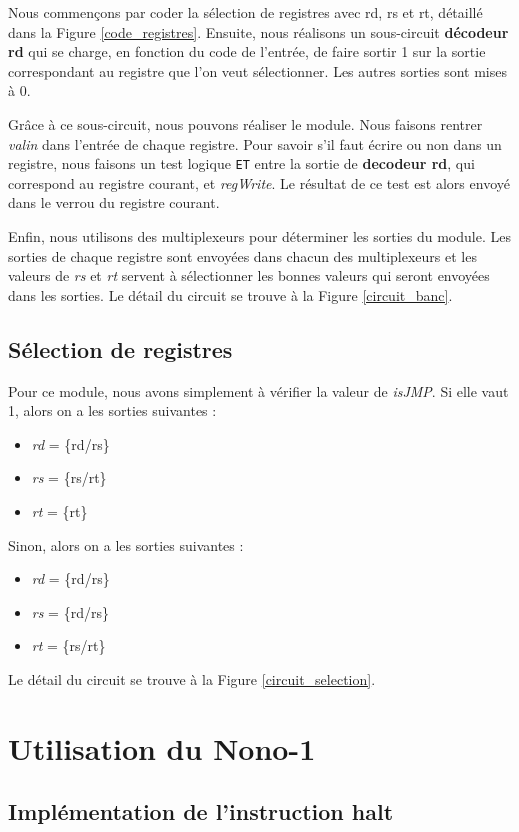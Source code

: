 \documentclass[10pt,a4paper]{article}
\begin{document}
Nous commençons par coder la sélection de registres avec rd, rs et rt, détaillé dans la Figure \ref{code_registres}. Ensuite, nous réalisons un sous-circuit \textbf{décodeur rd} qui se charge, en fonction du code de l'entrée, de faire sortir 1 sur la sortie correspondant au registre que l'on veut sélectionner. Les autres sorties sont mises à 0. 

Grâce à ce sous-circuit, nous pouvons réaliser le module. Nous faisons rentrer \textit{valin} dans l'entrée de chaque registre. Pour savoir s'il faut écrire ou non dans un registre, nous faisons un test logique \verb|ET| entre la sortie de \textbf{decodeur rd}, qui correspond au registre courant, et \textit{regWrite}. Le résultat de ce test est alors envoyé dans le verrou du registre courant.

Enfin, nous utilisons des multiplexeurs pour déterminer les sorties du module. Les sorties de chaque registre sont envoyées dans chacun des multiplexeurs et les valeurs de \textit{rs} et \textit{rt} servent à sélectionner les bonnes valeurs qui seront envoyées dans les sorties. Le détail du circuit se trouve à la Figure \ref{circuit_banc}. 

\subsection{Sélection de registres}

Pour ce module, nous avons simplement à vérifier la valeur de \textit{isJMP}. Si elle vaut 1, alors on a les sorties suivantes :
\begin{itemize}
\item \textit{rd} = \{rd/rs\}
\item \textit{rs} = \{rs/rt\}
\item \textit{rt} = \{rt\}
\end{itemize}
Sinon, alors on a les sorties suivantes :
\begin{itemize}
\item \textit{rd} = \{rd/rs\}
\item \textit{rs} = \{rd/rs\}
\item \textit{rt} = \{rs/rt\}
\end{itemize}
Le détail du circuit se trouve à la Figure \ref{circuit_selection}.
\newpage
\section{Utilisation du Nono-1}

\subsection{Implémentation de l'instruction halt}
\end{document}
